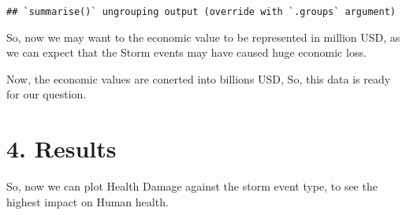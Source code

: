 \documentclass[]{article}
\newenvironment{Shaded}{\begin{snugshade}}{\end{snugshade}}
\newcommand{\KeywordTok}[1]{\textcolor[rgb]{0.13,0.29,0.53}{\textbf{#1}}}
\newcommand{\DataTypeTok}[1]{\textcolor[rgb]{0.13,0.29,0.53}{#1}}
\newcommand{\DecValTok}[1]{\textcolor[rgb]{0.00,0.00,0.81}{#1}}
\newcommand{\StringTok}[1]{\textcolor[rgb]{0.31,0.60,0.02}{#1}}
\newcommand{\OperatorTok}[1]{\textcolor[rgb]{0.81,0.36,0.00}{\textbf{#1}}}
\newcommand{\NormalTok}[1]{#1}
\begin{document}
\begin{Shaded}
\end{Shaded}

\begin{verbatim}
## `summarise()` ungrouping output (override with `.groups` argument)
\end{verbatim}

So, now we may want to the economic value to be represented in million
USD, as we can expect that the Storm events may have caused huge
economic loss.

\begin{Shaded}
\end{Shaded}

Now, the economic values are conerted into billions USD, So, this data
is ready for our question.

\section{4. Results}\label{results}

So, now we can plot Health Damage against the storm event type, to see
the highest impact on Human health.
\end{document}
